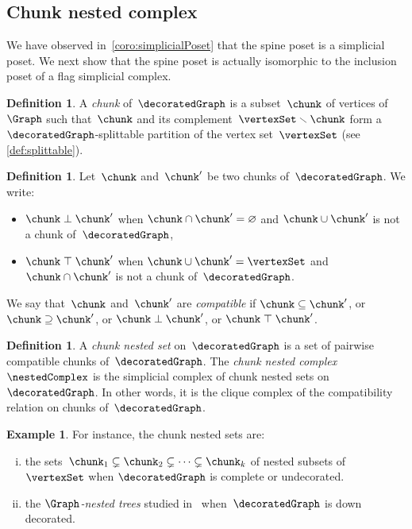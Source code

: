 \documentclass{amsart}
\theoremstyle{definition}
\newtheorem{definition}[theorem]{Definition}
\newtheorem{example}[theorem]{Example}
\newcommand{\ssm}{\smallsetminus} %
\newcommand{\darkblue}{\color{darkblue}} %
\newcommand{\defn}[1]{\textsl{\darkblue #1}} %
\newcommand{\negDisjoint}{\perp} %
\newcommand{\posDisjoint}{\;\top\;} %
\begin{document}

\subsection{Chunk nested complex}
\label{subsec:nestedComplex}

We have observed in~\cref{coro:simplicialPoset} that the spine poset is a simplicial poset.
We next show that the spine poset is actually isomorphic to the inclusion poset of a flag simplicial complex.

\begin{definition}
  \label{def:chunk}
  A \defn{chunk} of~$\decoratedGraph$ is a subset~$\chunk$ of vertices of~$\Graph$ such that~$\chunk$ and its complement~$\vertexSet \ssm \chunk$ form a $\decoratedGraph$-splittable partition of the vertex set~$\vertexSet$ (see \cref{def:splittable}).
\end{definition}

\begin{definition}
  \label{def:compatibleChunks}
  Let~$\chunk$ and~$\chunk'$ be two chunks of~$\decoratedGraph$.
  We write:
  \begin{itemize}
    \item $\chunk \negDisjoint \chunk'$ when $\chunk \cap \chunk' = \varnothing$ and $\chunk \cup \chunk'$ is not a chunk of~$\decoratedGraph$,
    \item $\chunk \posDisjoint \chunk'$ when $\chunk \cup \chunk' = \vertexSet$ and~$\chunk \cap \chunk'$ is not a chunk of~$\decoratedGraph$.
  \end{itemize}
  We say that~$\chunk$ and~$\chunk'$ are \defn{compatible} if $\chunk \subseteq \chunk'$, or $\chunk \supseteq \chunk'$, or $\chunk \negDisjoint \chunk'$, or $\chunk \posDisjoint \chunk'$.
\end{definition}

\begin{definition}
  \label{def:nestedComplex}
  A \defn{chunk nested set} on~$\decoratedGraph$ is a set of pairwise compatible chunks of~$\decoratedGraph$.
  The \defn{chunk nested complex}~$\nestedComplex$ is the simplicial complex of chunk nested sets on~$\decoratedGraph$.
  In other words, it is the clique complex of the compatibility relation on chunks of~$\decoratedGraph$.
\end{definition}

\begin{example}
  \label{exm:nestedComplex}
  For instance, the chunk nested sets are:
  \begin{enumerate}[(i)]
    \item the sets~$\chunk_1 \subsetneq \chunk_2 \subsetneq \dots \subsetneq \chunk_k$ of nested subsets of~$\vertexSet$ when $\decoratedGraph$ is complete or undecorated.
    \item the \defn{$\Graph$-nested trees} studied in~\cite{CarrDevadoss} when~$\decoratedGraph$ is down decorated.
  \end{enumerate}
\end{example}
\end{document}
